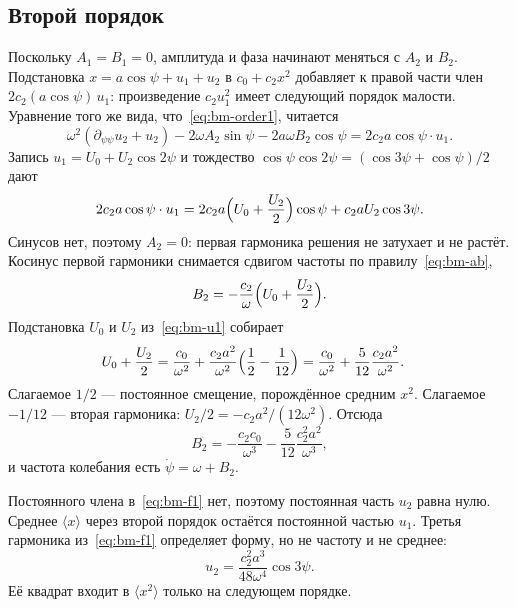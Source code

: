 \subsection{Второй порядок}
\label{sec:bm-second}

Поскольку $A_1=B_1=0$, амплитуда и фаза начинают меняться с $A_2$ и $B_2$. Подстановка $x=a\cos\psi+u_1+u_2$ в $c_0+c_2 x^2$ добавляет к правой части член $2c_2(a\cos\psi)\,u_1$: произведение $c_2 u_1^2$ имеет следующий порядок малости. Уравнение того же вида, что~\eqref{eq:bm-order1}, читается
\begin{equation}
\label{eq:bm-order2}
\omega^2(\partial_{\psi\psi}u_2+u_2)
-2\omega A_2\sin\psi
-2a\omega B_2\cos\psi
=2c_2 a\cos\psi\cdot u_1.
\end{equation}
Запись $u_1=U_0+U_2\cos 2\psi$ и тождество $\cos\psi\cos 2\psi=(\cos 3\psi+\cos\psi)/2$ дают
\begin{equation}
\label{eq:bm-f1}
2c_2 a\cos\psi\cdot u_1
=2c_2 a\Bigl(U_0+\frac{U_2}{2}\Bigr)\cos\psi
+c_2 a U_2\cos 3\psi.
\end{equation}
Синусов нет, поэтому $A_2=0$: первая гармоника решения не затухает и не растёт. Косинус первой гармоники снимается сдвигом частоты по правилу~\eqref{eq:bm-ab},
\begin{equation}
\label{eq:bm-b2-step}
B_2=-\frac{c_2}{\omega}\Bigl(U_0+\frac{U_2}{2}\Bigr).
\end{equation}
Подстановка $U_0$ и $U_2$ из~\eqref{eq:bm-u1} собирает
\begin{equation}
\label{eq:bm-split}
\begin{aligned}
U_0+\frac{U_2}{2}
&=\frac{c_0}{\omega^2}+\frac{c_2 a^2}{\omega^2}\Bigl(\frac12-\frac{1}{12}\Bigr)
=\frac{c_0}{\omega^2}+\frac{5}{12}\frac{c_2 a^2}{\omega^2}.
\end{aligned}
\end{equation}
Слагаемое $1/2$ --- постоянное смещение, порождённое средним $x^2$. Слагаемое $-1/12$ --- вторая гармоника: $U_2/2=-c_2 a^2/(12\omega^2)$. Отсюда
\begin{equation}
\label{eq:bm-b2}
B_2=-\frac{c_2 c_0}{\omega^3}-\frac{5}{12}\frac{c_2^2 a^2}{\omega^3},
\end{equation}
и частота колебания есть $\dot\psi=\omega+B_2$.

Постоянного члена в~\eqref{eq:bm-f1} нет, поэтому постоянная часть $u_2$ равна нулю. Среднее $\langle x\rangle$ через второй порядок остаётся постоянной частью $u_1$. Третья гармоника из~\eqref{eq:bm-f1} определяет форму, но не частоту и не среднее:
\begin{equation}
\label{eq:bm-v3}
u_2=\frac{c_2^2 a^3}{48\omega^4}\cos 3\psi.
\end{equation}
Её квадрат входит в $\langle x^2\rangle$ только на следующем порядке.

